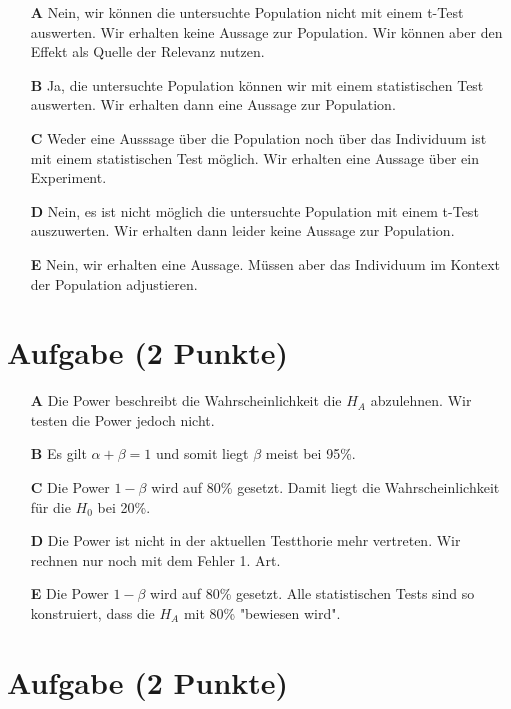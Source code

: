 \documentclass[a4paper, 9pt]{scrartcl}\usepackage[]{graphicx}\usepackage[]{xcolor}
\begin{document}
\begin{enumerate}
\item [\textbf{A} \msquare] Nein, wir können die untersuchte Population nicht mit einem t-Test auswerten. Wir erhalten keine Aussage zur Population. Wir können aber den Effekt als Quelle der Relevanz nutzen.
\item [\textbf{B} \msquare] Ja, die untersuchte Population können wir mit einem statistischen Test auswerten. Wir erhalten dann eine Aussage zur Population.
\item [\textbf{C} \msquare] Weder eine Ausssage über die Population noch über das Individuum ist mit einem statistischen Test möglich. Wir erhalten eine Aussage über ein Experiment.
\item [\textbf{D} \msquare] Nein, es ist nicht möglich die untersuchte Population mit einem t-Test auszuwerten. Wir erhalten dann leider keine Aussage zur Population.
\item [\textbf{E} \msquare] Nein, wir erhalten eine Aussage. Müssen aber das Individuum im Kontext der Population adjustieren.
\end{enumerate}

\section{Aufgabe \hfill (2 Punkte)}







\begin{enumerate}
\item [\textbf{A} \msquare] Die Power beschreibt die Wahrscheinlichkeit die $H_A$ abzulehnen. Wir testen die Power jedoch nicht.
\item [\textbf{B} \msquare] Es gilt $\alpha + \beta = 1$ und somit liegt $\beta$ meist bei 95\%.
\item [\textbf{C} \msquare] Die Power $1-\beta$ wird auf 80\% gesetzt. Damit liegt die Wahrscheinlichkeit für die $H_0$ bei 20\%.
\item [\textbf{D} \msquare] Die Power ist nicht in der aktuellen Testthorie mehr vertreten. Wir rechnen nur noch mit dem Fehler 1. Art.
\item [\textbf{E} \msquare] Die Power $1-\beta$ wird auf 80\% gesetzt. Alle statistischen Tests sind so konstruiert, dass die $H_A$ mit 80\% "bewiesen wird".
\end{enumerate}

\section{Aufgabe \hfill (2 Punkte)}
\end{document}
